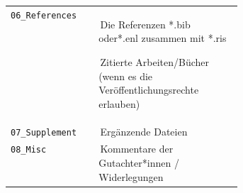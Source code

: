 {\begin{minipage}{\dimexpr\linewidth-2\fboxrule\relax}
\begin{tabularx}{\linewidth}{
				>{\raggedright\arraybackslash}p{0.38\linewidth}
				>{\raggedright\arraybackslash}X
			}
			\texttt{06\_References} &
			\,\tabitem Die Referenzen *.bib oder*.enl zusammen mit *.ris
			\par\smallskip
			\,\tabitem Zitierte Arbeiten/Bücher (wenn es die Veröffentlichungsrechte
			erlauben) \\
			
			\texttt{07\_Supplement} &
			\,\tabitem Ergänzende Dateien \\
			
			\texttt{08\_Misc} &
			\,\tabitem Kommentare der Gutachter*innen / Widerlegungen \\
			
		\end{tabularx}
		
	\end{minipage}%
}

\endgroup
